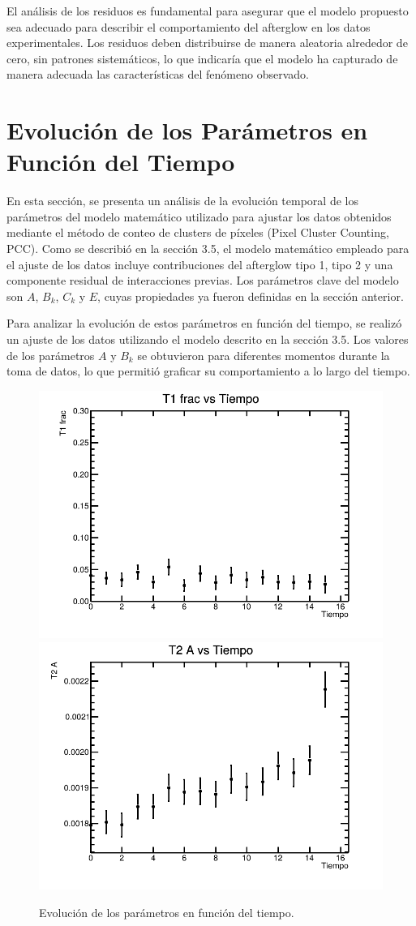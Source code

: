 El análisis de los residuos es fundamental para asegurar que el modelo propuesto sea adecuado para describir el comportamiento del afterglow en los datos experimentales. Los residuos deben distribuirse de manera aleatoria alrededor de cero, sin patrones sistemáticos, lo que indicaría que el modelo ha capturado de manera adecuada las características del fenómeno observado.

\section{Evolución de los Parámetros en Función del Tiempo}

En esta sección, se presenta un análisis de la evolución temporal de los parámetros del modelo matemático utilizado para ajustar los datos obtenidos mediante el método de conteo de clusters de píxeles (Pixel Cluster Counting, PCC). Como se describió en la sección 3.5, el modelo matemático empleado para el ajuste de los datos incluye contribuciones del afterglow tipo 1, tipo 2 y una componente residual de interacciones previas. Los parámetros clave del modelo son \(A\), \(B_k\), \(C_k\) y \(E\), cuyas propiedades ya fueron definidas en la sección anterior.

Para analizar la evolución de estos parámetros en función del tiempo, se realizó un ajuste de los datos utilizando el modelo descrito en la sección 3.5. Los valores de los parámetros \(A\) y \(B_k\) se obtuvieron para diferentes momentos durante la toma de datos, lo que permitió graficar su comportamiento a lo largo del tiempo.

\begin{figure}[h!]
    \centering
    \includegraphics[width=.4\textwidth]{Chapter3/T1F_vs_tiempo.png}\hspace{0.1 cm}     \includegraphics[width=.4\textwidth]{Chapter3/T2A_vs_tiempo.png}

    \caption{Evolución de los parámetros en función del tiempo.}
    \label{fig:T1F_vs_tiempo}
\end{figure}

